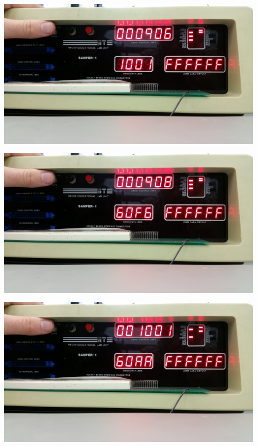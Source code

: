 \documentclass[12pt, twocolumn]{article}
\begin{document}
\begin{center}
\includegraphics[width=1\linewidth]{Lab1/20150120_094644}
\end{center}
\begin{center}
\includegraphics[width=1\linewidth]{Lab1/20150120_094646}
\end{center}
\begin{center}
\includegraphics[width=1\linewidth]{Lab1/20150120_094648}
\end{center}
\end{document}
